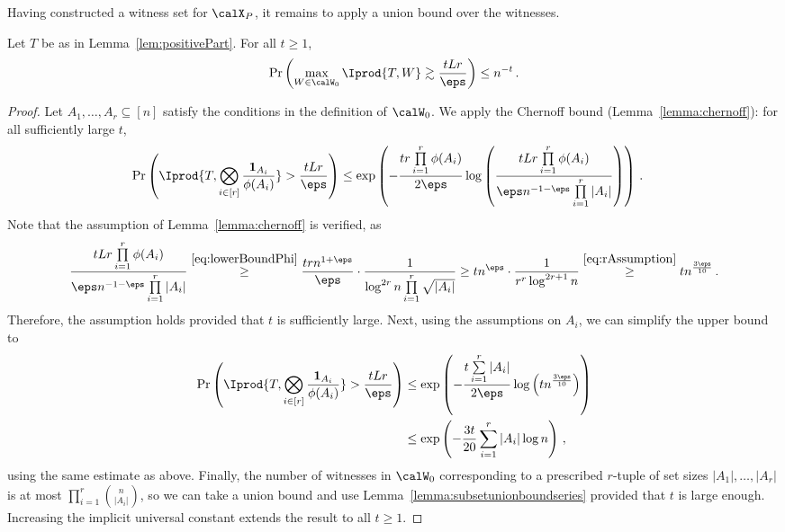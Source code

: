 \documentclass[11pt,a4paper]{article}
\begin{document}
Having constructed a witness set for $\calX_P$, it remains to apply a union bound over the witnesses.

\begin{lemma}\label{lem:0tail}
    Let $T$ be as in Lemma~\ref{lem:positivePart}. For all $t\ge 1$,
    \[
        \Pr\left(\max_{W\in \calW_0} \Iprod{T, W}\gtrsim \frac {tLr} \eps\right)\le n^{-t}\,.
    \]
\end{lemma}

\begin{proof}
    Let $A_1, \ldots, A_r \subseteq [n]$ satisfy the
    conditions in the definition of
    $\calW_0$.
    We apply the Chernoff bound (Lemma~\ref{lemma:chernoff}):
    for all sufficiently large $t$,
    \begin{align*}
        \Pr\left(\Iprod{T, \bigotimes_{i\in [r]} \frac {\mathbf 1_{A_i}} {\phi(A_i)}} > \frac {tLr} \eps\right)&\le \exp\left(-\frac {tr \prod\limits_{i=1}^r \phi(A_i)}{2\eps} \log\left(\frac { tLr \prod\limits_{i=1}^r \phi(A_i)} { \eps  n^{-1-\eps}\prod\limits_{i=1}^r |A_i| }\right)\right)\,.
    \end{align*}
    Note that the assumption
    of Lemma~\ref{lemma:chernoff}
    is verified, as
    \[
        \frac{tLr \prod\limits_{i=1}^r \phi(A_i)} {\eps  n^{-1-\eps} \prod\limits_{i=1}^r |A_i|} \overset{\eqref{eq:lowerBoundPhi}} \ge \frac {tr n^{1+\eps}} \eps \cdot \frac {1} {\log^{2r} n\prod\limits_{i=1}^r \sqrt {|A_i|} }\ge  {t n^{\eps}}  \cdot \frac {1} {r^r \log^{2r+1} n}\overset{\eqref{eq:rAssumption}}\ge tn^{\frac {3\eps} {10}}\,.
    \]
    Therefore,
    the assumption holds provided
    that $t$ is sufficiently large. 
    Next, using the assumptions on $A_i$,
    we can simplify the upper bound to
    \begin{align*}
        \Pr\left(\Iprod{T, \bigotimes_{i\in [r]} \frac {\mathbf 1_{A_i}} {\phi(A_i)}} > \frac{tLr}\eps\right)&\le \exp\left(-\frac {t\sum\limits_{i=1}^r |A_i|} {2\eps} \log\left(t n^{\frac{3 \eps}{10} }\right)\right)\\
        &\le \exp\left(- \frac {3t} {20} \sum\limits_{i=1}^r |A_i|\log n\right)\,,
    \end{align*}
    using the same estimate as above.    
    Finally, the number of witnesses in $\calW_0$ corresponding to a prescribed $r$-tuple of set sizes $|A_1|, \ldots, |A_r|$ is at most $\prod_{i=1}^r \binom n {|A_i|}$, so we can take a union bound and use Lemma~\ref{lemma:subsetunionboundseries} provided that $t$ is large enough. Increasing the implicit universal constant extends the result to all $t\ge 1$.
\end{proof}
\end{document}
